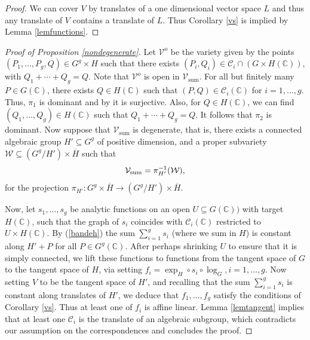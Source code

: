 \documentclass[12pt, reqno]{amsart}
\newcommand{\C}{\mathbb{C}}
\newcommand{\Vsum}{\mathcal{V}_{\text{sum}}}
\theoremstyle{remark}
\theoremstyle{definition}
\numberwithin{equation}{section}
\begin{document}
\begin{proof}
    
    We can cover $V$ by translates of a one dimensional vector space $L$ and thus any translate of $V$ contains a translate of $L$. Thus Corollary \ref{vs} is implied by Lemma \ref{lemfunctions}.  
\end{proof}
\begin{proof}[Proof of Proposition \ref{nondegenerate}] 
Let $\mathcal{V}^o$ be the variety given by the points $(P_1, \dots, P_g, Q) \in G^g\times H$ such that   there exists  $(P_i, Q_i) \in \mathcal{C}_i\cap (G\times H(\C))$, with  $Q_1 + \cdots +Q_g = Q$. Note that $\mathcal{V}^o$
is open in $\mathcal{V}_{\text{sum}}$. For all but finitely many $P \in G(\C)$, there exists $Q \in H(\C)$ such that $(P, Q) \in \mathcal{C}_i(\C)$ for $i = 1, \dots, g$. Thus, $\pi_1$ is dominant and by \cite[Theorem 1.11]{Shafarevic} it is surjective. Also, for $Q \in H(\C)$, we can find $(Q_1, \dots, Q_g) \in H(\C)$ such that $Q_1 + \cdots + Q_g = Q$. It follows that $\pi_2$ is dominant. Now suppose that $\Vsum$ is degenerate, that is, there exists a connected algebraic group $H' \subseteq G^g$ of positive dimension, and a proper subvariety $\mathcal{W} \subseteq (G^g/H') \times \overline{H}$ such that 
\begin{equation} \label{bandeh}
    \mathcal{V}_{\rm sum} = \pi_{H'}^{-1}(\mathcal{W}), 
\end{equation}
for the projection $\pi_{H'}: G^g \times \overline{H} \rightarrow (G^g/H')\times \overline{H}$. 


Now, let $s_1, \dots, s_g$ be  analytic functions on an open $U \subseteq G(\C))$ with target $H(\C)$, such that the graph of $s_i$ coincides with $\mathcal{C}_i(\C)$ restricted to $U\times H(\C)$. By (\ref{bandeh}) the sum $\sum_{i = 1}^gs_i$ (where we sum in $H$) is constant along $H' + P$ for all $P \in G^g(\mathbb{C})$. After perhaps shrinking $U$ to ensure that it is simply connected, we lift these functions to functions from the tangent space of $G$ to the tangent space of $H$, via setting $f_i = \exp_{H}\circ s_i\circ \log_G, i =1,\dots, g$. Now setting $V$  to be the tangent space of $H'$, and recalling that the sum $\sum_{i = 1}^gs_i$ is constant along translates of $H'$, we deduce that $f_1, \dots, f_g$ satisfy the conditions of Corollary \ref{vs}. Thus at least one of $f_i$ is affine linear. Lemma \ref{lemtangent} implies that at least one $\mathcal{C}_i$ is the translate of an algebraic subgroup, which contradicts  our assumption on the correspondences and concludes the proof. 
\end{proof}
\end{document}
